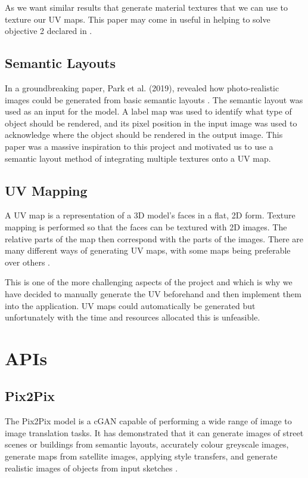 \noindent As we want similar results that generate material textures that we can use to texture our UV maps. This paper may come in useful in helping to solve objective 2 declared in .

\subsection{Semantic Layouts}
\label{subsec:semanticlayouts}
In a groundbreaking paper, Park et al. (2019), revealed how photo-realistic images could be generated from basic semantic layouts \cite{park2019semantic}. The semantic layout was used as an input for the model. A label map was used to identify what type of object should be rendered, and its pixel position in the input image was used to acknowledge where the object should be rendered in the output image. This paper was a massive inspiration to this project and motivated us to use a semantic layout method of integrating multiple textures onto a UV map.

\subsection{UV Mapping}
\label{subsec:uvmapping}
A UV map is a representation of a 3D model's faces in a flat, 2D form. Texture mapping is performed so that the faces can be textured with 2D images. The relative parts of the map then correspond with the parts of the images. There are many different ways of generating UV maps, with some maps being preferable over others \cite{interactivetexturemapping}. 

This is one of the more challenging aspects of the project and which is why we have decided to manually generate the UV beforehand and then implement them into the application. UV maps could automatically be generated but unfortunately with the time and resources allocated this is unfeasible.

\section{APIs}
\label{sec:apis}
\subsection{Pix2Pix}
\label{subsec:pix2pix}
The Pix2Pix model is a cGAN capable of performing a wide range of image to image translation tasks. It has demonstrated that it can generate images of street scenes or buildings from semantic layouts, accurately colour greyscale images, generate maps from satellite images, applying style transfers, and generate realistic images of objects from input sketches \cite{isola2018imagetoimage}.


